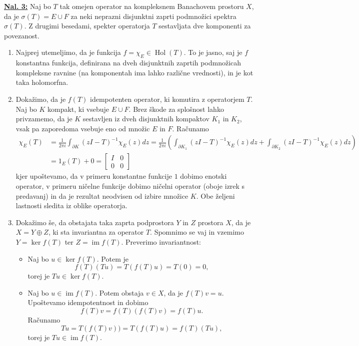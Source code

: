 \documentclass[a4paper, 12pt]{article}
\DeclareMathOperator{\im}{im}
\DeclareMathOperator{\Hol}{Hol}
\begin{document}
\underline{\textbf{Nal. 3:}}
Naj bo $T$ tak omejen operator na kompleksnem Banachovem prostoru $X$, da je $\sigma(T) = E \cup F$ za neki neprazni disjunktni zaprti podmnožici spektra $\sigma(T)$. Z drugimi besedami, spekter operatorja $T$ sestavljata dve komponenti za povezanost.
\begin{enumerate}[label=(\alph*)]
	\item Najprej utemeljimo, da je funkcija $f = \chi_E \in \Hol(T)$. To je jasno, saj je $f$ konstantna funkcija, definirana na dveh disjunktnih zaprtih podmnožicah kompleksne ravnine (na komponentah ima lahko različne vrednosti), in je kot taka holomorfna.
	\item Dokažimo, da je $f(T)$ idempotenten operator, ki komutira z operatorjem $T$. Naj bo $K$ kompakt, ki vsebuje $E \cup F$. Brez škode za splošnost lahko privzamemo, da je $K$ sestavljen iz dveh disjunktnih kompaktov $K_1$ in $K_2$, vsak pa zaporedoma vsebuje eno od množic $E$ in $F$. Računamo
	\begin{align*}
	\chi_E(T) &= \frac{1}{2\pi i} \int_{\partial K} (zI - T)^{-1}\chi_E(z) dz = \frac{1}{2\pi i}\left(\int_{\partial K_1} (zI - T)^{-1}\chi_E(z) dz + \int_{\partial K_2} (zI - T)^{-1}\chi_E(z) dz \right)\\
	&= 1_E(T) + 0 =
	\begin{bmatrix}
	I & 0 \\
	0& 0
	\end{bmatrix}
	\end{align*}
	kjer upoštevamo, da v primeru konstantne funkcije $1$ dobimo enotski operator, v primeru ničelne funkcije dobimo ničelni operator (oboje izrek s predavanj) in da je rezultat neodvisen od izbire množice $K$. Obe željeni lastnosti sledita iz oblike operatorja.
	\item Dokažimo še, da obstajata taka zaprta podprostora $Y$ in $Z$ prostora $X$, da je $X = Y \oplus Z$, ki sta invariantna za operator $T$. Spomnimo se vaj in vzemimo $Y = \ker f(T)$ ter $Z = \im f(T)$. Preverimo invariantnost:
	\begin{itemize}
		\item Naj bo $u \in \ker f(T)$. Potem je
		\[
		f(T)(Tu) = T(f(T)u) = T(0) = 0,
		\]
		torej je $Tu \in \ker f(T)$.
		\item Naj bo $u \in \im f(T)$. Potem obstaja $v \in X$, da je $f(T)v = u$. Upoštevamo idempotentnost in dobimo
		\[
		f(T)v = f(T)(f(T)v) = f(T)u.
		\]
		Računamo
		\[
		Tu = T(f(T)v) ) = T(f(T)u) = f(T)(Tu),
		\]
		torej je $Tu \in \im f(T)$.
	\end{itemize}
\end{enumerate}
\end{document}
